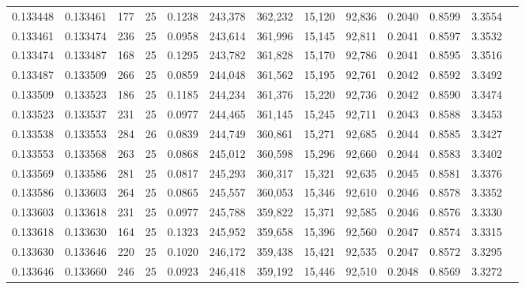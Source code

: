 \begin{tabular}{rrrrrrrrrrrrr}
0.133448 & 0.133461 &   177 &  25 &                                     0.1238 & 243,378 & 362,232 &  15,120 &  92,836 & 0.2040 & 0.8599 & 3.3554 \\
0.133461 & 0.133474 &   236 &  25 &                                     0.0958 & 243,614 & 361,996 &  15,145 &  92,811 & 0.2041 & 0.8597 & 3.3532 \\
0.133474 & 0.133487 &   168 &  25 &                                     0.1295 & 243,782 & 361,828 &  15,170 &  92,786 & 0.2041 & 0.8595 & 3.3516 \\
0.133487 & 0.133509 &   266 &  25 &                                     0.0859 & 244,048 & 361,562 &  15,195 &  92,761 & 0.2042 & 0.8592 & 3.3492 \\
0.133509 & 0.133523 &   186 &  25 &                                     0.1185 & 244,234 & 361,376 &  15,220 &  92,736 & 0.2042 & 0.8590 & 3.3474 \\
0.133523 & 0.133537 &   231 &  25 &                                     0.0977 & 244,465 & 361,145 &  15,245 &  92,711 & 0.2043 & 0.8588 & 3.3453 \\
0.133538 & 0.133553 &   284 &  26 &                                     0.0839 & 244,749 & 360,861 &  15,271 &  92,685 & 0.2044 & 0.8585 & 3.3427 \\
0.133553 & 0.133568 &   263 &  25 &                                     0.0868 & 245,012 & 360,598 &  15,296 &  92,660 & 0.2044 & 0.8583 & 3.3402 \\
0.133569 & 0.133586 &   281 &  25 &                                     0.0817 & 245,293 & 360,317 &  15,321 &  92,635 & 0.2045 & 0.8581 & 3.3376 \\
0.133586 & 0.133603 &   264 &  25 &                                     0.0865 & 245,557 & 360,053 &  15,346 &  92,610 & 0.2046 & 0.8578 & 3.3352 \\
0.133603 & 0.133618 &   231 &  25 &                                     0.0977 & 245,788 & 359,822 &  15,371 &  92,585 & 0.2046 & 0.8576 & 3.3330 \\
0.133618 & 0.133630 &   164 &  25 &                                     0.1323 & 245,952 & 359,658 &  15,396 &  92,560 & 0.2047 & 0.8574 & 3.3315 \\
0.133630 & 0.133646 &   220 &  25 &                                     0.1020 & 246,172 & 359,438 &  15,421 &  92,535 & 0.2047 & 0.8572 & 3.3295 \\
0.133646 & 0.133660 &   246 &  25 &                                     0.0923 & 246,418 & 359,192 &  15,446 &  92,510 & 0.2048 & 0.8569 & 3.3272 \\

\end{tabular}
